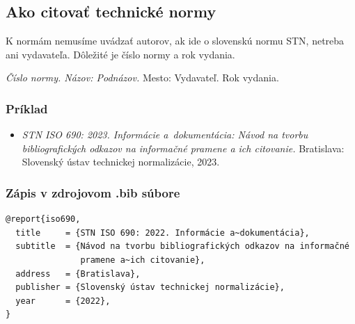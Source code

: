 \documentclass[../../../thesis.tex]{subfiles}
\begin{document}
\subsection{Ako citovať technické normy}
K normám nemusíme uvádzať autorov, ak ide o slovenskú normu STN, netreba ani vydavateľa. Dôležité je číslo normy a rok vydania.

\begin{trivlist}
\item \textit{Číslo normy. Názov: Podnázov.} Mesto: Vydavateľ. Rok vydania.
\end{trivlist}

\subsubsection*{\normalsize Príklad}
\begin{itemize}
  \item \textit{STN ISO 690: 2023. Informácie a~dokumentácia: Návod na tvorbu bibliografických odkazov na informačné pramene a ich citovanie.} Bratislava: Slovenský ústav technickej normalizácie, 2023.
\end{itemize}

\subsubsection*{\normalsize Zápis v zdrojovom .bib súbore}
\begin{verbatim}
@report{iso690,
  title     = {STN ISO 690: 2022. Informácie a~dokumentácia},
  subtitle  = {Návod na tvorbu bibliografických odkazov na informačné
               pramene a~ich citovanie},
  address   = {Bratislava},
  publisher = {Slovenský ústav technickej normalizácie},
  year      = {2022},
}
\end{verbatim}
\end{document}
